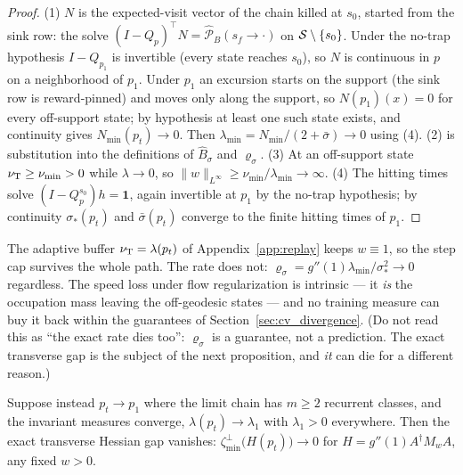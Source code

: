 \begin{proof}
(1) $N$ is the expected-visit vector of the chain killed at $s_0$, started from the sink
row: the solve $(I-Q_p)^\top N = \widehat{\mathcal P}_B(s_f\to\cdot)$ on
$\mathcal S\setminus\{s_0\}$. Under the no-trap hypothesis $I-Q_{p_1}$ is invertible
(every state reaches $s_0$), so $N$ is continuous in $p$ on a neighborhood of $p_1$.
Under $p_1$ an excursion starts on the support (the sink row is reward-pinned) and moves
only along the support, so $N(p_1)(x)=0$ for every off-support state; by hypothesis at
least one such state exists, and continuity gives $N_{\min}(p_t)\to0$. Then
$\lambda_{\min}=N_{\min}/(2+\bar\sigma)\to0$ using (4). (2) is substitution into the
definitions of $\widehat B_\sigma$ and $\varrho_\sigma$. (3) At an off-support state
$\nu_{\mathrm{T}}\geq\nu_{\min}>0$ while $\lambda\to0$, so
$\|w\|_{L^\infty}\geq\nu_{\min}/\lambda_{\min}\to\infty$. (4) The hitting times solve
$(I-Q^{s_0}_p)h=\mathbf 1$, again invertible at $p_1$ by the no-trap hypothesis; by
continuity $\sigma_*(p_t)$ and $\bar\sigma(p_t)$ converge to the finite hitting times of
$p_1$.
\end{proof}

\begin{remark}\label{rem:replay_rescue}
The adaptive buffer $\nu_{\mathrm{T}} = \lambda(p_t)$ of Appendix~\ref{app:replay} keeps
$w\equiv1$, so the step cap survives the whole path. The rate does not:
$\varrho_\sigma = g''(1)\lambda_{\min}/\sigma_*^2\to0$ regardless. The speed loss under
flow regularization is intrinsic --- it \emph{is} the occupation mass leaving the
off-geodesic states --- and no training measure can buy it back within the guarantees of
Section~\ref{sec:cv_divergence}. (Do not read this as ``the exact rate dies too'':
$\varrho_\sigma$ is a guarantee, not a prediction. The exact transverse gap is the
subject of the next proposition, and \emph{it} can die for a different reason.)
\end{remark}

\begin{proposition}\label{prop:gap_collapse}
Suppose instead $p_t\to p_1$ where the limit chain has $m\geq2$ recurrent classes, and
the invariant measures converge, $\lambda(p_t)\to\lambda_1$ with $\lambda_1>0$
everywhere. Then the exact transverse Hessian gap vanishes:
$\zeta^{\perp}_{\min}\bigl(H(p_t)\bigr)\to0$ for
$H = g''(1)A^\dagger M_wA$, any fixed $w>0$.
\end{proposition}

